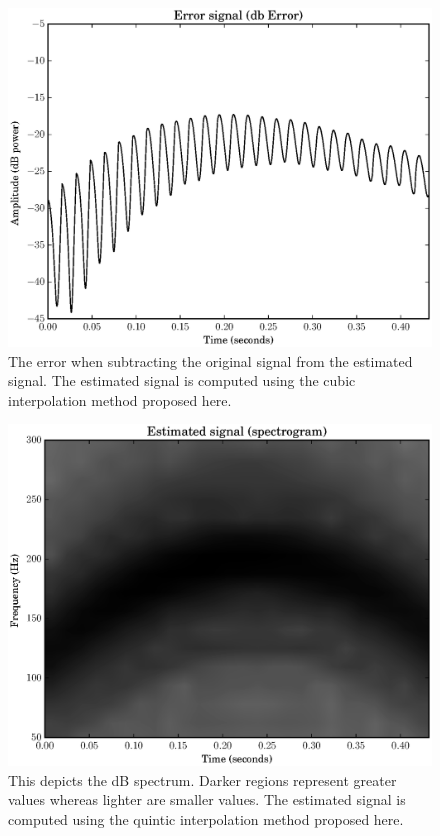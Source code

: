 \begin{figure}[!t]
    \includegraphics[width=\textwidth]{plots/mq_mod_cubic_error.eps}
    \caption{The error when subtracting the original signal from the estimated
        signal. The estimated signal is computed using the cubic interpolation
        method proposed here.
    \label{plot:mqmodcubicerror}}
\end{figure}


\begin{figure}[!t]
    \includegraphics[width=\textwidth]{plots/mq_mod_quintic_estimated_spec.eps}
    \caption{This depicts the dB spectrum. Darker regions represent greater
        values whereas lighter are smaller values. The estimated signal is
        computed using the quintic interpolation method proposed here.
    \label{plot:mqmodcubicestimatedspec}}
\end{figure}

